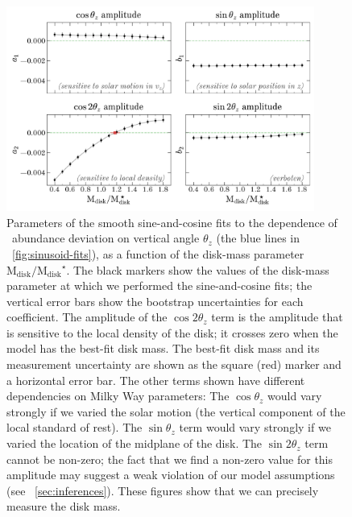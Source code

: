 \documentclass[modern]{aastex63}
\newcommand{\mdisk}{\ensuremath{\mathrm{M}_\mathrm{disk}}}
\newcommand{\mratio}{\ensuremath{\mdisk / \mdisk^\star}}
\begin{document}
\begin{figure}[!tp] %
  \begin{mdframed}
    \color{captiongray}
  \begin{center}
  \includegraphics[width=0.9\textwidth]{coeff-vs-mdisk.pdf}
  \end{center}
  \caption{%
    Parameters of the smooth sine-and-cosine fits to the dependence of \mgfe\
    abundance deviation on vertical angle $\theta_z$ (the blue lines in
    \figurename~\ref{fig:sinusoid-fits}), as a function of the disk-mass
    parameter \mratio.
    The black markers show the values of the disk-mass parameter at which we
    performed the sine-and-cosine fits; the vertical error bars show the
    bootstrap uncertainties for each coefficient.
    The amplitude of the $\cos 2\theta_z$ term is the amplitude that is
    sensitive to the local density of the disk; it crosses zero when the model
    has the best-fit disk mass.
    The best-fit disk mass and its measurement uncertainty are shown as the
    square (red) marker and a horizontal error bar.
    The other terms shown have different dependencies on Milky Way parameters:
    The $\cos\theta_z$ would vary strongly if we varied the solar motion (the
    vertical component of the local standard of rest).
    The $\sin\theta_z$ term would vary strongly if we varied the location of the
    midplane of the disk.
    The $\sin 2\theta_z$ term cannot be non-zero; the fact that we find a
    non-zero value for this amplitude may suggest a weak violation of our model
    assumptions (see \sectionname~\ref{sec:inferences}).
    These figures show that we can precisely measure the disk mass.
  \label{fig:coeff-mdisk}
  }
  \end{mdframed}
\end{figure}
\end{document}
